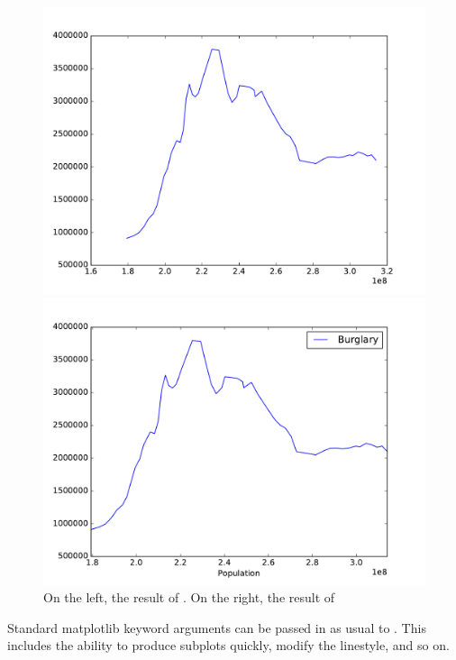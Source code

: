 \begin{figure}[H] %
    \centering
    \begin{minipage}[b]{0.48\textwidth}
    \includegraphics[width=\textwidth]{pltBurglary.pdf}
    \end{minipage}
    \quad
    \begin{minipage}[b]{0.48\textwidth}
    \includegraphics[width=\textwidth]{dfBurglary.pdf}
    \end{minipage}
    \caption{On the left, the result of . On the right, the result of }
    \label{fig:intro2}
\end{figure}

Standard matplotlib keyword arguments can be passed in as usual to .
This includes the ability to produce subplots quickly, modify the linestyle, and so on.

